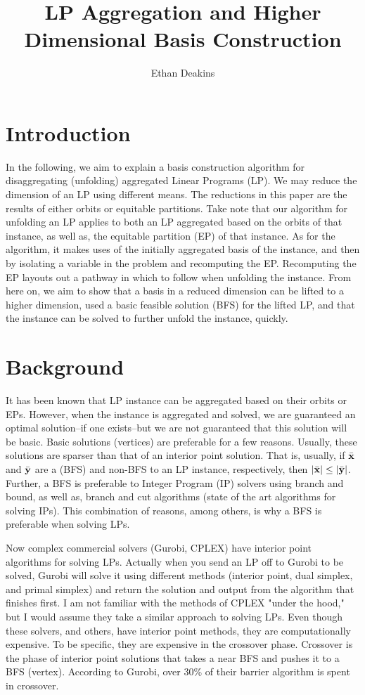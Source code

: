 \documentclass[11pt]{article} %
\title{LP Aggregation and Higher Dimensional Basis Construction}
\author{Ethan Deakins}
\begin{document}
	\maketitle
	
	\section*{Introduction}
	In the following, we aim to explain a basis construction algorithm for disaggregating (unfolding) aggregated Linear Programs (LP).  We may reduce the dimension of an LP using different means.  The reductions in this paper are the results of either orbits or equitable partitions.  Take note that our algorithm for unfolding an LP applies to both an LP aggregated based on the orbits of that instance, as well as, the equitable partition (EP) of that instance.  As for the algorithm, it makes uses of the initially aggregated basis of the instance, and then by isolating a variable in the problem and recomputing the EP.  Recomputing the EP layouts out a pathway in which to follow when unfolding the instance.  From here on, we aim to show that a basis in a reduced dimension can be lifted to a higher dimension, used a basic feasible solution (BFS) for the lifted LP, and that the instance can be solved to further unfold the instance, quickly.
	
	\section*{Background}
	It has been known that LP instance can be aggregated based on their orbits or EPs.  However, when the instance is aggregated and solved, we are guaranteed an optimal solution--if one exists--but we are not guaranteed that this solution will be basic.  Basic solutions (vertices) are preferable for a few reasons.  Usually, these solutions are sparser than that of an interior point solution.  That is, usually, if $\bar{\bf{x}}$ and $\bar{\bf{y}}$ are a (BFS) and non-BFS to an LP instance, respectively, then $|\bar{\bf{x}}| \leq |\bar{\bf{y}}|$.  Further, a BFS is preferable to Integer Program (IP) solvers using branch and bound, as well as, branch and cut algorithms (state of the art algorithms for solving IPs).  This combination of reasons, among others, is why a BFS is preferable when solving LPs.  
	
	Now complex commercial solvers (Gurobi, CPLEX) have interior point algorithms for solving LPs.  Actually when you send an LP off to Gurobi to be solved, Gurobi will solve it using different methods (interior point, dual simplex, and primal simplex) and return the solution and output from the algorithm that finishes first.  I am not familiar with the methods of CPLEX "under the hood," but I would assume they take a similar approach to solving LPs.  Even though these solvers, and others, have interior point methods, they are computationally expensive.  To be specific, they are expensive in the crossover phase.  Crossover is the phase of interior point solutions that takes a near BFS and pushes it to a BFS (vertex).  According to Gurobi, over 30\% of their barrier algorithm is spent in crossover.  
	
\end{document}
